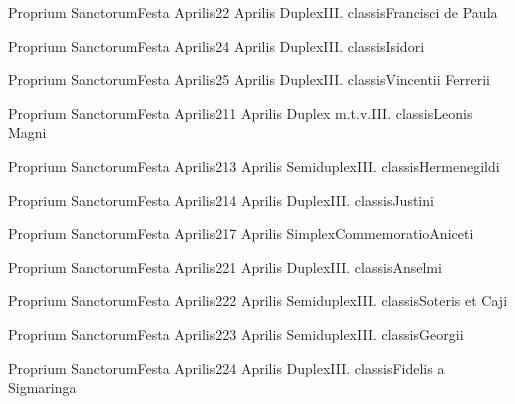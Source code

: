 \documentclass[liber-responsorialis_sanctorale.tex]{subfiles}
\begin{document}

	{Proprium Sanctorum}{Festa Aprilis}{2}{2 Aprilis}
	{Duplex}{III. classis}{Francisci de Paula}
	{\conprubric}
	{\respdetemp}

	{Proprium Sanctorum}{Festa Aprilis}{2}{4 Aprilis}
	{Duplex}{III. classis}{Isidori}
	{\copodorubric}
	{\respdetemp}

	{Proprium Sanctorum}{Festa Aprilis}{2}{5 Aprilis}
	{Duplex}{III. classis}{Vincentii Ferrerii}
	{\conprubric}
	{\respdetemp}

	{Proprium Sanctorum}{Festa Aprilis}{2}{11 Aprilis}
	{Duplex m.t.v.}{III. classis}{Leonis Magni}
	{\copodorubric}
	{\respdetemp}

	{Proprium Sanctorum}{Festa Aprilis}{2}{13 Aprilis}
	{Semiduplex}{III. classis}{Hermenegildi}
	{\umvelrubric}
	{\respdetemp}

	{Proprium Sanctorum}{Festa Aprilis}{2}{14 Aprilis}
	{Duplex}{III. classis}{Justini}
	{\umvelrubric}
	{\respdetemp}

	{Proprium Sanctorum}{Festa Aprilis}{2}{17 Aprilis}
	{Simplex}{Commemoratio}{Aniceti}
	{\respdetemp}
	{\respdetemp}

	{Proprium Sanctorum}{Festa Aprilis}{2}{21 Aprilis}
	{Duplex}{III. classis}{Anselmi}
	{\conprubric}
	{\respdetemp}

	{Proprium Sanctorum}{Festa Aprilis}{2}{22 Aprilis}
	{Semiduplex}{III. classis}{Soteris et Caji}
	{\mrtprubric}
	{\respdetemp}

	{Proprium Sanctorum}{Festa Aprilis}{2}{23 Aprilis}
	{Semiduplex}{III. classis}{Georgii}
	{\mrtprubric}
	{\respdetemp}

	{Proprium Sanctorum}{Festa Aprilis}{2}{24 Aprilis}
	{Duplex}{III. classis}{Fidelis a Sigmaringa}
	{\mrtprubric}
	{\respdetemp}
\end{document}
